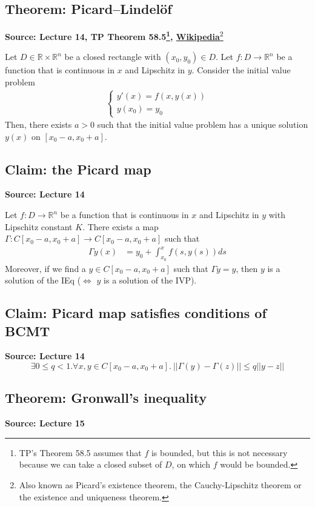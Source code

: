 \documentclass[11pt]{article}
\newcommand{\R}{\mathbb{R}}
\begin{document}
\subsection{Theorem: Picard–Lindelöf}
\textbf{Source: Lecture 14, TP Theorem 58.5\footnote{TP's Theorem 58.5 assumes that $f$ is bounded, but this is not necessary because we can take a closed subset of $D$, on which $f$ would be bounded.}, \href{https://en.wikipedia.org/wiki/Picard\%E2\%80\%93Lindel\%C3\%B6f_theorem}{Wikipedia}}\footnote{Also known as Picard's existence theorem, the Cauchy-Lipschitz theorem or the existence and uniqueness theorem.}

Let $D \in \R \times \R^n$ be a closed rectangle with $(x_0, y_0) \in D$. Let $f: D \to \R^n$ be a function that is continuous in $x$ and Lipschitz in $y$. Consider the initial value problem
\begin{align*}
    \begin{cases}
            y'(x) = f(x,y(x)) \\
            y(x_0) = y_0 
    \end{cases}
\end{align*}
Then, there exists $a > 0$ such that the initial value problem has a unique solution $y(x)$ on $[x_0 - a, x_0 + a]$. 


\subsection{Claim: the Picard map}
\textbf{Source: Lecture 14}

Let $f: D \to \R^n$ be a function that is continuous in $x$ and Lipschitz in $y$ with Lipschitz constant $K$. There exists a map $\Gamma: C[x_0 - a, x_0 + a] \to C[x_0 - a, x_0 + a]$ such that 
\begin{align*}
    \Gamma y (x) &= y_0 + \int_{x_0}^x f(s, y(s)) ds 
\end{align*}
Moreover, if we find a $y \in C[x_0 - a, x_0 + a]$ such that $\Gamma y = y$, then $y$ is a solution of the IEq ($\Longleftrightarrow$ $y$ is a solution of the IVP). 

\subsection{Claim: Picard map satisfies conditions of BCMT}
\textbf{Source: Lecture 14}
$$\exists 0 \leq q < 1. \forall x, y \in C[x_0 - a, x_0 + a]. ~||\Gamma(y) - \Gamma(z)||\leq q||y-z||$$

\subsection{Theorem: Gronwall's inequality}
\textbf{Source: Lecture 15}
\end{document}
